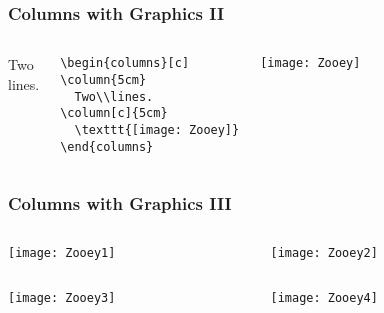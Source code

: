 \begin{frame}[fragile]
\frametitle{Columns with Graphics \textrm{II}}

\begin{columns}[c]
  \column{5cm}
    Two\\lines.
    \begin{tiny}
      \begin{verbatim}
\begin{columns}[c]
\column{5cm}
  Two\\lines.
\column[c]{5cm}
  \texttt{[image: Zooey]}
\end{columns}
      \end{verbatim}
    \end{tiny}
  \column[c]{5cm}
    \centerline{\texttt{[image: Zooey]}}
\end{columns}

\end{frame}
\begin{frame}[plain]
\frametitle{Columns with Graphics \textrm{III}}

\begin{columns}
  \begin{column}[T]{.5\textwidth}
    \centerline{\texttt{[image: Zooey1]}}
  \end{column}

  \begin{column}[T]{.5\textwidth}
    \centerline{\texttt{[image: Zooey2]}}
  \end{column}
\end{columns}

\vfill

\begin{columns}
  \begin{column}[T]{.5\textwidth}
    \centerline{\texttt{[image: Zooey3]}}
  \end{column}

  \begin{column}[T]{.5\textwidth}
    \centerline{\texttt{[image: Zooey4]}}
  \end{column}
\end{columns}

\end{frame}
